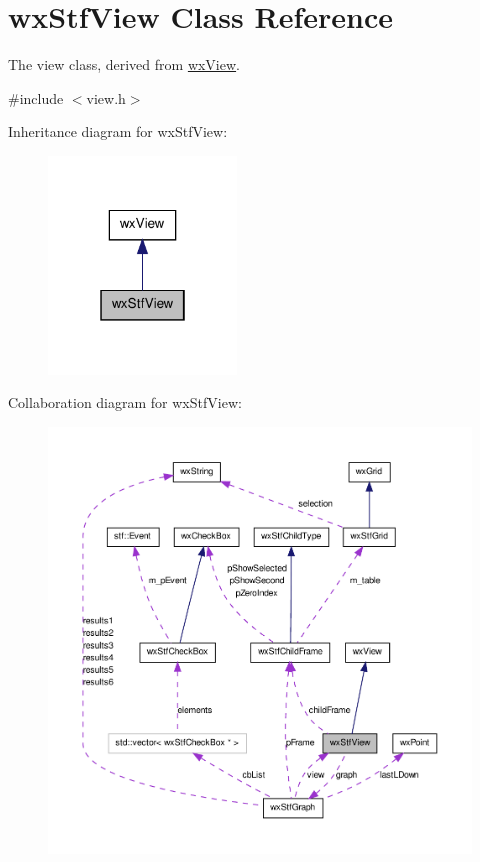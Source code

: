 \hypertarget{classwxStfView}{
\section{wxStfView Class Reference}
\label{classwxStfView}
}


The view class, derived from \hyperlink{classwxView}{wxView}.  




{\ttfamily \#include $<$view.h$>$}



Inheritance diagram for wxStfView:
\nopagebreak
\begin{figure}[H]
\begin{center}
\leavevmode
\includegraphics[width=142pt]{classwxStfView__inherit__graph}
\end{center}
\end{figure}


Collaboration diagram for wxStfView:
\nopagebreak
\begin{figure}[H]
\begin{center}
\leavevmode
\includegraphics[width=400pt]{classwxStfView__coll__graph}
\end{center}
\end{figure}
